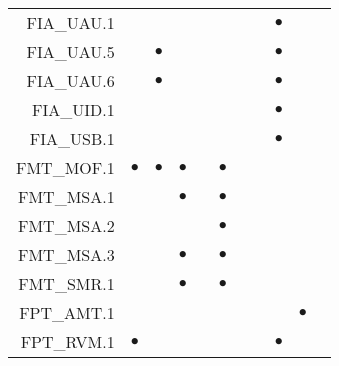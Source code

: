 \documentclass[12pt,english]{scrbook}
\newcommand{\oh}{$\bullet$}
\begin{document}
\begin{longtable}{rRRRRRRRRRR}
FIA\_UAU.1          &            &                &               &          &               &                        &      & \oh                &                 &                    \\   
FIA\_UAU.5          &            &  \oh           &               &          &               &                        &      & \oh                &                 &                    \\   
FIA\_UAU.6          &            &  \oh           &               &          &               &                        &      & \oh                &                 &                    \\   
FIA\_UID.1          &            &                &               &          &               &                        &      & \oh                &                 &                    \\   
FIA\_USB.1          &            &                &               &          &               &                        &      &  \oh               &                 &                    \\   
FMT\_MOF.1          & \oh        &  \oh           &  \oh          &          & \oh           &                        &      &                    &                 &                    \\   
FMT\_MSA.1          &            &                &  \oh          &          & \oh           &                        &      &                    &                 &                    \\   
FMT\_MSA.2          &            &                &               &          & \oh           &                        &      &                    &                 &                    \\   
FMT\_MSA.3          &            &                &  \oh          &          & \oh           &                        &      &                    &                 &                    \\   
FMT\_SMR.1          &            &                &  \oh          &          & \oh           &                        &      &                    &                 &                    \\   
FPT\_AMT.1          &            &                &               &          &               &                        &      &                    &    \oh          &                    \\   
FPT\_RVM.1          & \oh        &                &               &          &               &                        &      &  \oh               &                 &                    \\   

\end{longtable}
\end{document}
